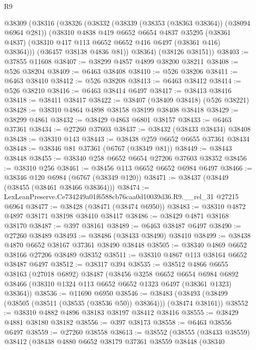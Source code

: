 \begin{lexlean}{R9}
\begin{coremodule}
    @38309
      (@38316
        (@38326
          (@38332
            (@38339 (@38353 (@38363 @38364)) (@38094 @6964 @281))
            (@38310
              @4838
              @419
              @6652
              @6654
              @4837
              @35295
              (@38361 @4837)
              (@38310 @417 @113 @6652 @6652 @416 @6497 (@38361 @416) @38364)))
          (@36457 @38138 @4836 @81))
        @38364)
      (@38126 @38151))
@38403 := @37855 @11608
@38407 := @38299 @4857 @4899 @38200 @38211
@38408 := @526 @38204
@38409 := @6463 @38408
@38410 := @526 @38206
@38411 := @6463 @38410
@38412 := @526 @38208
@38413 := @6463 @38412
@38414 := @526 @38210
@38416 := @6463 @38414 @6497
@38417 := @38413 @38416
@38418 := @38411 @38417
@38422 := @38407 (@38409 @38418) (@526 @38221)
@38428 := @38310 @4864 @4898 @38158 @38199 @38408 @38418
@38429 := @38299 @4861
@38432 := @38429 @4863 @6801 @38157
@38433 := @6463 @37361
@38434 := @27260 @37603
@38437 := @38432 (@38433 @38434) @38408
@38438 := @38310 @143
@38443 := @38438 @259 @6652 @6655 @37361 @38434
@38448 := @38346 @81 @37361 (@6767 (@38349 @81))
@38449 := @38443 @38448
@38455 := @38340 @258 @6652 @6654 @27206 @37603 @38352
@38456 := @38310 @256
@38461 := @38456 @113 @6652 @6652 @6984 @6497
@38466 := @38346 @120 @6984 (@6767 (@38349 @120))
@38471 := @38437 (@38449 (@38455 (@38461 @38466 @38364)))
@38474 := LexLeanPreserve.Ce734249a01f6588cb76caa0d10039d36.R9.__rel_31 @27215 @6964
@38477 := @38428 (@38471 (@38474 @6950))
@38483 := @38310 @4872 @4897 @38171 @38198 @38410 @38417
@38486 := @38429 @4871 @38168 @38170
@38487 := @397 @38161
@38489 := @6463 @38487 @6497
@38490 := @27260 @38489
@38493 := @38486 (@38433 @38490) @38410
@38499 := @38438 @4870 @6652 @38167 @37361 @38490 @38448
@38505 := @38340 @4869 @6652 @38166 @27206 @38489 @38352
@38511 := @38310 @4867 @113 @38164 @6652 @38487 @6497
@38512 := @38317 @394
@38535 := @38512
    @4866
    @6655
    @38163
    (@27018 @6892)
    @38487
    (@38456
      @3258
      @6652
      @6654
      @6984
      @6892
      @38466
      (@38310 @1324 @113 @6652 @6652 @1323 @6497 (@38361 @1323) @38364))
@38536 := @11690 @6950
@38546 := @38483 (@38493 (@38499 (@38505 (@38511 (@38535 (@38536 @50)) @38364))) (@38474 @38161))
@38552 := @38310 @4882 @4896 @38183 @38197 @38412 @38416
@38555 := @38429 @4881 @38180 @38182
@38556 := @397 @38173
@38558 := @6463 @38556 @6497
@38559 := @27260 @38558
@38613 := @38552
    (@38555
      (@38433 @38559)
      @38412
      (@38438
        @4880
        @6652
        @38179
        @37361
        @38559
        @38448
        (@38340

\end{coremodule}
\end{lexlean}
